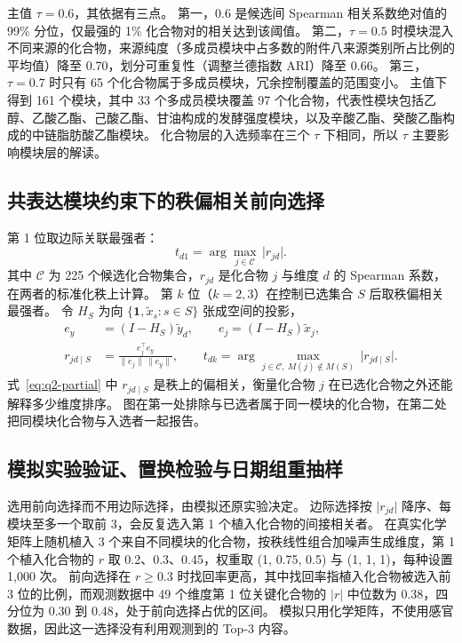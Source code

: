 主值 $\tau=0.6$，其依据有三点。
第一，0.6 是候选间 Spearman 相关系数绝对值的 99\% 分位，仅最强的 1\% 化合物对的相关达到该阈值。
第二，$\tau=0.5$ 时模块混入不同来源的化合物，来源纯度（多成员模块中占多数的附件八来源类别所占比例的平均值）降至 0.70，划分可重复性（调整兰德指数 ARI）降至 0.66。
第三，$\tau=0.7$ 时只有 65 个化合物属于多成员模块，冗余控制覆盖的范围变小。
主值下得到 161 个模块，其中 33 个多成员模块覆盖 97 个化合物，代表性模块包括乙醇、乙酸乙酯、己酸乙酯、甘油构成的发酵强度模块，以及辛酸乙酯、癸酸乙酯构成的中链脂肪酸乙酯模块。
化合物层的入选频率在三个 $\tau$ 下相同，所以 $\tau$ 主要影响模块层的解读。

\subsection{共表达模块约束下的秩偏相关前向选择}

第 1 位取边际关联最强者：
\begin{equation}\label{eq:q2-top1}
t_{d1}=\arg\max_{j\in\mathcal C}\,\lvert r_{jd}\rvert .
\end{equation}
其中 $\mathcal C$ 为 225 个候选化合物集合，$r_{jd}$ 是化合物 $j$ 与维度 $d$ 的 Spearman 系数，在两者的标准化秩上计算。
第 $k$ 位（$k=2,3$）在控制已选集合 $S$ 后取秩偏相关最强者。
令 $H_S$ 为向 $\{\mathbf 1,\tilde x_s:s\in S\}$ 张成空间的投影，
\begin{equation}\label{eq:q2-partial}
\begin{aligned}
e_y&=(I-H_S)\tilde y_d,\qquad e_j=(I-H_S)\tilde x_j,\\
r_{jd\mid S}&=\frac{e_j^\top e_y}{\lVert e_j\rVert\,\lVert e_y\rVert},\qquad
t_{dk}=\arg\max_{j\in\mathcal C,\ M(j)\notin M(S)}\,\lvert r_{jd\mid S}\rvert .
\end{aligned}
\end{equation}
式~\eqref{eq:q2-partial} 中 $r_{jd\mid S}$ 是秩上的偏相关，衡量化合物 $j$ 在已选化合物之外还能解释多少维度排序。
图在第一处排除与已选者属于同一模块的化合物，在第二处把同模块化合物与入选者一起报告。

\subsection{模拟实验验证、置换检验与日期组重抽样}

选用前向选择而不用边际选择，由模拟还原实验决定。
边际选择按 $\lvert r_{jd}\rvert$ 降序、每模块至多一个取前 3，会反复选入第 1 个植入化合物的间接相关者。
在真实化学矩阵上随机植入 3 个来自不同模块的化合物，按秩线性组合加噪声生成维度，第 1 个植入化合物的 $r$ 取 0.2、0.3、0.45，权重取 (1, 0.75, 0.5) 与 (1, 1, 1)，每种设置 1,000 次。
前向选择在 $r\ge0.3$ 时找回率更高，其中找回率指植入化合物被选入前 3 位的比例，而观测数据中 49 个维度第 1 位关键化合物的 $\lvert r\rvert$ 中位数为 0.38，四分位为 0.30 到 0.48，处于前向选择占优的区间。
模拟只用化学矩阵，不使用感官数据，因此这一选择没有利用观测到的 Top-3 内容。

